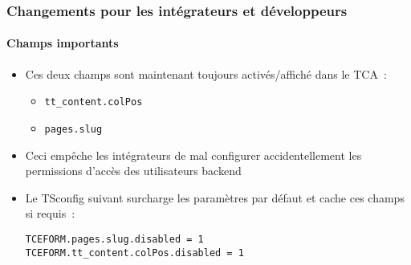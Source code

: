 %

\begin{frame}[fragile]
	\frametitle{Changements pour les intégrateurs et développeurs}
	\framesubtitle{Champs importants}


	\begin{itemize}
		\item Ces deux champs sont maintenant toujours activés/affiché dans le TCA~:
			\begin{itemize}
				\item \texttt{tt\_content.colPos}
				\item \texttt{pages.slug}
			\end{itemize}
		\item Ceci empêche les intégrateurs de mal configurer accidentellement les
			permissions d'accès des utilisateurs backend
		\item Le TSconfig suivant surcharge les paramètres par défaut et cache ces
			champs si requis~:
\begin{lstlisting}
TCEFORM.pages.slug.disabled = 1
TCEFORM.tt_content.colPos.disabled = 1
\end{lstlisting}

	\end{itemize}

\end{frame}


